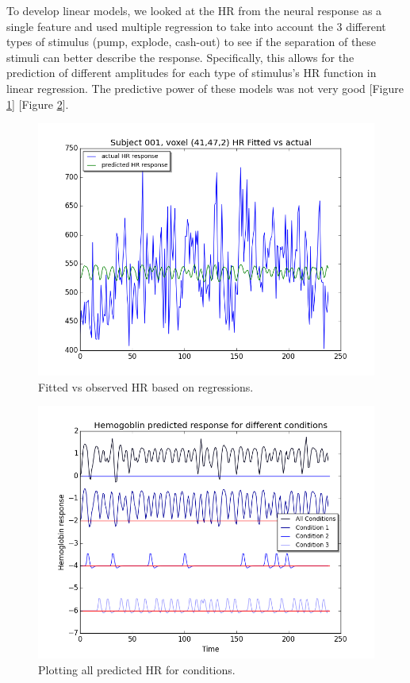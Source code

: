 \par To develop linear models, we looked at the HR from the neural response as a single feature and used multiple regression to take into account the 3 different types of stimulus (pump, explode, cash-out) to see if the separation of these stimuli can better describe the response. Specifically, this allows for the prediction of different amplitudes for each type of stimulus's HR function in linear regression. The predictive power of these models was not very good [Figure \ref{fig:fit_vs_act}] [Figure \ref{fig:all_cond_time}]. 

\begin{figure}[ht]
\centering
\includegraphics[scale=.5]{images/fitted_vs_actual_mult_regression}
\caption{Fitted vs observed HR based on regressions.}
\label{fig:fit_vs_act}
\end{figure}
  
\begin{figure}[ht]
\centering
\includegraphics[scale=.5]{images/all_cond_time}  
\caption{Plotting all predicted HR for conditions.}
\label{fig:all_cond_time}
\end{figure}

